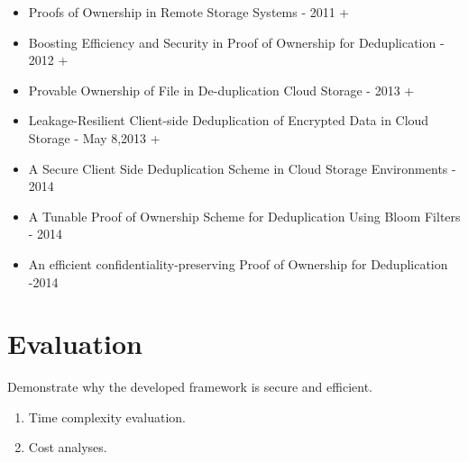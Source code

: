 \documentclass[12pt]{article}
\begin{document}
\begin{itemize}
 \item Proofs of Ownership in Remote Storage Systems - 2011 + 
 \item Boosting Efficiency and Security in Proof of Ownership for Deduplication - 2012 +
 \item Provable Ownership of File in De-duplication Cloud Storage - 2013 +
 \item Leakage-Resilient Client-side Deduplication of Encrypted Data in Cloud Storage - May 8,2013 +
 \item A Secure Client Side Deduplication Scheme in Cloud Storage Environments - 2014
 \item A Tunable Proof of Ownership Scheme for Deduplication Using Bloom Filters - 2014
 \item An efficient confidentiality-preserving Proof of Ownership for Deduplication -2014
 
\end{itemize}

\pagebreak

\section{Evaluation}
\label{sec:5}
Demonstrate why the developed framework  is secure and efficient. 


\begin{enumerate}
 \item Time complexity evaluation.
 \item Cost analyses. 
\end{enumerate}





\pagebreak

\end{document}
